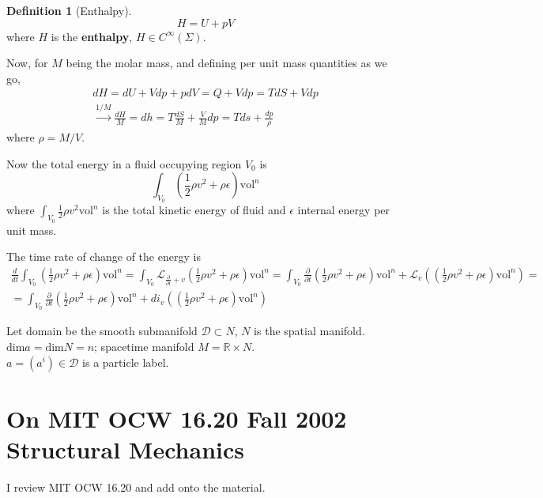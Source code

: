 \documentclass[twoside,landscape,10pt]{amsart}
\theoremstyle{plain}
\theoremstyle{definition}
\newtheorem{definition}{Definition}
\theoremstyle{remark}
\begin{document}
\begin{multicols*}{2}
\begin{definition}[Enthalpy]
  \begin{equation}
    H = U + pV
\end{equation}
where $H$ is the \textbf{enthalpy}, $H \in C^{\infty}(\Sigma)$.  
\end{definition}

Now, for $M$ being the molar mass, and defining per unit mass quantities as we go,
\[
\begin{gathered}
  dH = dU + Vdp + pdV = Q + Vdp = TdS + Vdp \\
  \xrightarrow{ 1/M} \frac{dH}{M} = dh = T \frac{dS}{M} + \frac{V}{M} dp = Tds + \frac{dp}{\rho}
\end{gathered}
\]
where $\rho = M/V$.  

Now the total energy in a fluid occupying region $V_0$ is 
\[
\int_{V_0} \left( \frac{1}{2} \rho v^2 + \rho \epsilon \right)\text{vol}^n
\]
where $\int_{V_0} \frac{1}{2} \rho v^2 \text{vol}^n$ is the total kinetic energy of fluid and $\epsilon$ internal energy per unit mass.  

The time rate of change of the energy is 
\[
\begin{gathered}
  \frac{d}{dt} \int_{V_0} ( \frac{1}{2} \rho v^2 + \rho \epsilon )\text{vol}^n = \int_{V_0} \mathcal{L}_{ \frac{\partial}{\partial t} + v } (\frac{1}{2} \rho v^2 + \rho \epsilon )\text{vol}^n = \int_{V_0} \frac{\partial }{\partial t} (\frac{1}{2} \rho v^2 + \rho \epsilon ) \text{vol}^n + \mathcal{L}_v ((\frac{1}{2} \rho v^2 + \rho \epsilon ) \text{vol}^n ) = \\
  = \int_{V_0} \frac{\partial }{\partial t} (\frac{1}{2} \rho v^2 + \rho \epsilon ) \text{vol}^n + di_v ((\frac{1}{2} \rho v^2 + \rho \epsilon ) \text{vol}^n ) 
\end{gathered}
\]






Let domain be the smooth submanifold $\mathcal{D} \subset N$, $N$ is the spatial manifold. $\text{dim}a = \text{dim}N=n$; spacetime manifold $M = \mathbb{R}\times N$.  \\
\phantom{Let} $a =(a^i) \in \mathcal{D}$ is a particle label.  

\part{On MIT OCW 16.20 Fall 2002 Structural Mechanics}

I review MIT OCW 16.20\cite{PLagace2002} and add onto the material.  


\end{multicols*}
\end{document}
